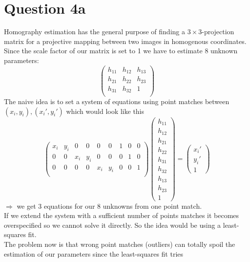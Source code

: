 \documentclass[a4paper]{scrartcl}
\begin{document}
\section*{Question 4a}
Homography estimation has the general purpose of finding a $3 \times 
3$-projection matrix for a projective mapping between two images in homogenous 
coordinates. Since the scale factor of our matrix is set to 1 we have to 
estimate 8 unknown parameters:
\begin{equation*}
\begin{pmatrix}
h_{11} & h_{12} & h_{13}\\
h_{21} & h_{22} & h_{23}\\
h_{31} & h_{32} & 1\\
\end{pmatrix}
\end{equation*}
The naive idea is to set a system of equations using point matches between 
$(x_i,y_i), (x_i',y_i')$ which would look like this
\begin{equation*}
\begin{pmatrix}
x_i & y_i & 0 & 0 & 0 & 0 & 1 & 0 & 0\\
0 & 0 & x_i & y_i & 0 & 0 & 0 & 1 & 0\\
0 & 0 & 0 & 0 & x_i & y_i & 0 & 0 & 1\\
\end{pmatrix}
\begin{pmatrix}
h_{11}\\
h_{12}\\
h_{21}\\
h_{22}\\
h_{31}\\
h_{32}\\
h_{13}\\
h_{23}\\
1
\end{pmatrix}
=
\begin{pmatrix}
x_i'\\[3pt]
y_i'\\[3pt]
1
\end{pmatrix}
\end{equation*}
$\Rightarrow$ we get 3 equations for our 8 unknowns from one point match.\\
If we extend the system with a sufficient number of points matches it becomes 
overspecified so we cannot solve it directly. So the idea would be using a 
least-squares fit.\\
The problem now is that wrong point matches (outliers) can totally spoil the 
estimation of our parameters since the least-squares fit tries 
\end{document}

